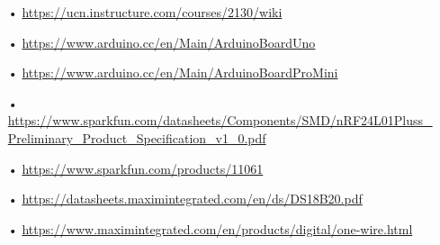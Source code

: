 \begin{enumerate}
	\item[•] \url{https://ucn.instructure.com/courses/2130/wiki}
	\item[•] \url{https://www.arduino.cc/en/Main/ArduinoBoardUno}
	\item[•] \url{https://www.arduino.cc/en/Main/ArduinoBoardProMini}
	\item[•] \url{https://www.sparkfun.com/datasheets/Components/SMD/nRF24L01Pluss_Preliminary_Product_Specification_v1_0.pdf}
	\item[•] \url{https://www.sparkfun.com/products/11061}
	\item[•] \url{https://datasheets.maximintegrated.com/en/ds/DS18B20.pdf}
	\item[•]\url {https://www.maximintegrated.com/en/products/digital/one-wire.html}
\end{enumerate}


